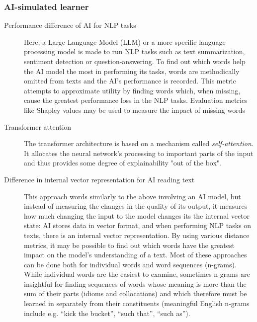 \subsubsection{AI-simulated learner}
\begin{description}
	\item [Performance difference of AI for NLP tasks]
	      Here, a Large Language Model (LLM) or a more specific language processing model is made to run NLP tasks such as text summarization, sentiment detection or question-answering.
	      To find out which words help the AI model the most in performing its tasks, words are methodically omitted from texts and the AI’s performance is recorded.
	      This metric attempts to approximate utility by finding words which, when missing, cause the greatest performance loss in the NLP tasks.
	      Evaluation metrics like Shapley values \cite{wangShapleyExplanationNetworks2021} may be used to measure the impact of missing words
	\item [Transformer attention]
	      The transformer architecture is based on a mechanism called \textit{self-attention}.
	      It allocates the neural network's processing to important parts of the input and thus provides some degree of explainability "out of the box".

	\item [Difference in internal vector representation for AI reading text]
	      This approach words similarly to the above involving an AI model, but instead of measuring the changes in the quality of its output, it measures how much changing the input to the model changes its the internal vector state: AI stores data in vector format, and when performing NLP tasks on texts, there is an internal vector representation.
	      By using various distance metrics, it may be possible to find out which words have the greatest impact on the model’s understanding of a text.
	      Most of these approaches can be done both for individual words and word sequences (n-grams).
	      While individual words are the easiest to examine, sometimes n-grams are insightful for finding sequences of words whose meaning is more than the sum of their parts (idioms and collocations) and which therefore must be learned in separately from their constituents (meaningful English n-grams include e.g. “kick the bucket”, “such that”, “such as”).


\end{description}
